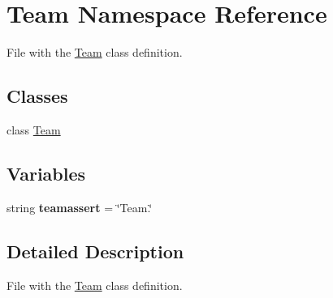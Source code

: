 \hypertarget{namespaceTeam}{\section{\-Team \-Namespace \-Reference}
\label{namespaceTeam}
}


\-File with the \hyperlink{namespaceTeam}{\-Team} class definition.  


\subsection*{\-Classes}
\begin{DoxyCompactItemize}
\item 
class \hyperlink{classTeam_1_1Team}{\-Team}
\end{DoxyCompactItemize}
\subsection*{\-Variables}
\begin{DoxyCompactItemize}
\item 
\hypertarget{namespaceTeam_a1678d14befad72a7125974f7a549ec2f}{string {\bfseries teamassert} = \char`\"{}\-Team.\char`\"{}}\label{namespaceTeam_a1678d14befad72a7125974f7a549ec2f}

\end{DoxyCompactItemize}


\subsection{\-Detailed \-Description}
\-File with the \hyperlink{namespaceTeam}{\-Team} class definition. 